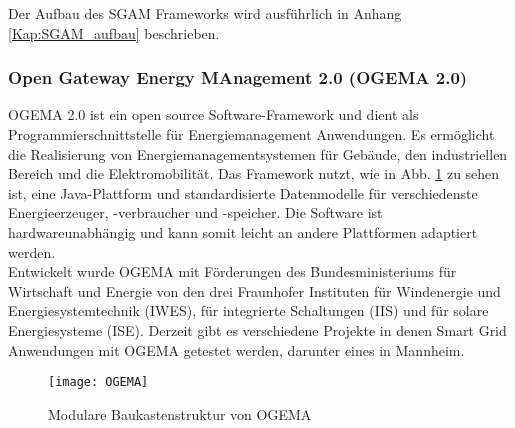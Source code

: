 				
				Der Aufbau des SGAM Frameworks wird ausführlich in Anhang \ref{Kap:SGAM_aufbau} beschrieben.
				
		

			\subsubsection{Open Gateway Energy MAnagement 2.0 (OGEMA 2.0)}
				\ac{OGEMA} 2.0 ist ein open source Software-Framework und dient als Programmierschnittstelle für Energiemanagement Anwendungen. Es ermöglicht die Realisierung von Energiemanagementsystemen für Gebäude, den industriellen Bereich und die Elektromobilität. Das Framework nutzt, wie in Abb. \ref{Abb:OGEMA_Aufbau} zu sehen ist, eine Java-Plattform und standardisierte Datenmodelle für verschiedenste Energieerzeuger, -verbraucher und -speicher. Die Software ist hardwareunabhängig und kann somit leicht an andere Plattformen adaptiert werden. \cite{OGEMA_Praes} \\
                
				Entwickelt wurde OGEMA mit Förderungen des Bundesministeriums für Wirtschaft und Energie von den drei Fraunhofer Instituten für Windenergie und Energiesystemtechnik (IWES), für integrierte Schaltungen (IIS) und für solare Energiesysteme (ISE). Derzeit gibt es verschiedene Projekte in denen Smart Grid Anwendungen mit OGEMA getestet werden, darunter eines in Mannheim. \cite{ogemamoma}
				
				\begin{figure}[h]
					\centering
					\texttt{[image: OGEMA]}
					\caption{Modulare Baukastenstruktur von OGEMA \cite{OGEMA_Praes}}
					\label{Abb:OGEMA_Aufbau}
				\end{figure}			
	
				
				
